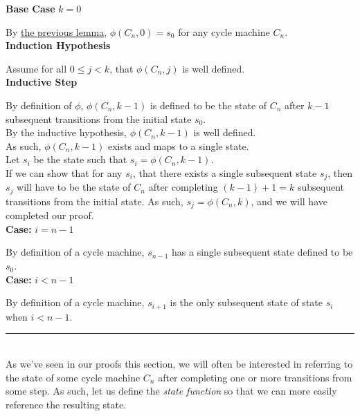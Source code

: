 \documentclass[a4paper,12pt]{article}
\begin{document}
\noindent
\textbf{Base Case} $k = 0$

\noindent By \hyperlink{lemma:phi_of_0}{the previous lemma}, $\phi(C_n, 0) = s_0$ for any cycle machine $C_n$.\\


\noindent
\textbf{Induction Hypothesis}

\noindent Assume for all $0 \leq j < k$, that $\phi(C_n, j)$ is well defined.\\


\noindent
\textbf{Inductive Step}

\noindent By definition of $\phi$, $\phi(C_n, k - 1)$ is defined to be the state of $C_n$ after $k - 1$ subsequent transitions from the initial state $s_0$.\\

\noindent By the inductive hypothesis, $\phi(C_n, k - 1)$ is well defined.\\

\noindent As such, $\phi(C_n, k - 1)$ exists and maps to a single state.\\

\noindent Let $s_i$ be the state such that $s_i = \phi(C_n, k - 1)$.\\

\noindent If we can show that for any $s_i$, that there exists a single subsequent state $s_j$, then $s_j$ will have to be the state of $C_n$ after completing $(k - 1) + 1 = k$ subsequent transitions from the initial state. As such, $s_j = \phi(C_n, k)$, and we will have completed our proof.\\ 


\noindent
\textbf{Case:} $i = n - 1$

\noindent By definition of a cycle machine, $s_{n-1}$ has a single subsequent state defined to be $s_0$.\\


\noindent
\textbf{Case:} $i < n - 1$

\noindent By definition of a cycle machine, $s_{i+1}$ is the only subsequent state of state $s_i$ when $i < n - 1$.

\begin{center}
\noindent\rule{8cm}{0.4pt}
\end{center}




\noindent \\
As we've seen in our proofs this section, we will often be interested in referring to the state of some cycle machine $C_n$ after completing one or more transitions from some step. As such, let us define the \textit{state function} so that we can more easily reference the resulting state.\\
\end{document}
